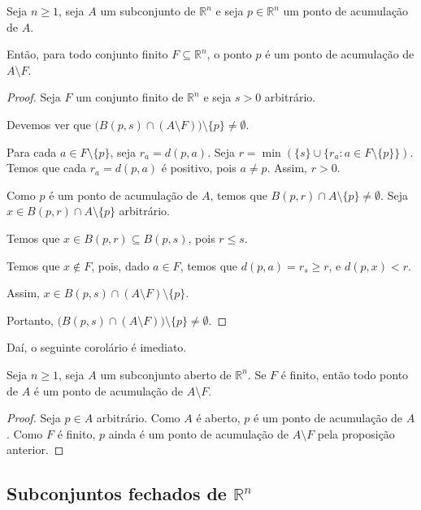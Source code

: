 \begin{proposition}\label{proposicaoPontoAcumulacaoRemocaoPontos}
    Seja $n\geq 1$, seja $A$ um subconjunto de $\mathbb R^n$ e seja $p \in \mathbb R^n$ um ponto de acumulação de $A$.

    Então, para todo conjunto finito $F\subseteq \mathbb R^n$, o ponto $p$ é um ponto de acumulação de $A\setminus F$.
\end{proposition}
\begin{proof}
    Seja $F$ um conjunto finito de $\mathbb R^n$ e seja $s>0$ arbitrário.

    Devemos ver que $\big(B(p, s)\cap (A\setminus F)\big)\setminus\{p\}\neq \emptyset$.

    Para cada $a \in F\setminus\{p\}$, seja $r_a = d(p, a)$.
    Seja $r = \min(\{s\}\cup\{r_a : a \in F\setminus\{p\}\})$.
    Temos que cada $r_a=d(p, a)$ é positivo, pois $a\neq p$.
    Assim, $r>0$.

    Como $p$ é um ponto de acumulação de $A$, temos que $B(p, r)\cap A\setminus\{p\}\neq \emptyset$.
    Seja $x \in B(p, r)\cap A\setminus\{p\}$ arbitrário.

    Temos que $x\in B(p, r)\subseteq B(p, s)$, pois $r\leq s$.

    Temos que $x\notin F$, pois, dado $a \in F$, temos que $d(p, a)=r_s\geq r$, e $d(p, x)<r$.

    Assim, $x \in B(p, s)\cap (A\setminus F)\setminus\{p\}$.

    Portanto, $\big(B(p, s)\cap (A\setminus F)\big)\setminus\{p\}\neq \emptyset$.
\end{proof}

Daí, o seguinte corolário é imediato.
\begin{corollary}
    Seja $n\geq 1$, seja $A$ um subconjunto aberto de $\mathbb R^n$.
    Se $F$ é finito, então todo ponto de $A$ é um ponto de acumulação de $A\setminus F$.
\end{corollary}
\begin{proof}
    Seja $p \in A$ arbitrário.
    Como $A$ é aberto, $p$ é um ponto de acumulação de $A$.
    Como $F$ é finito, $p$ ainda é um ponto de acumulação de $A\setminus F$ pela proposição anterior.
\end{proof}

\subsection{Subconjuntos fechados de \texorpdfstring{$\mathbb R^n$}{Rn}}

